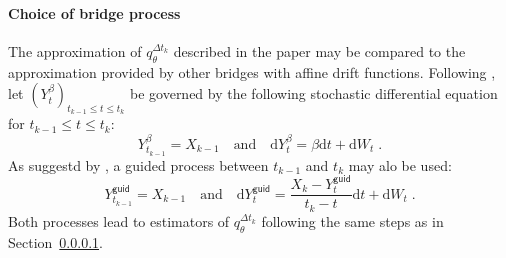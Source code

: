 \documentclass[12pt]{article}
\newcommand{\rmd}{\mathrm{d}}
\newcommand{\eqsp}{\;}
\newcommand{\1}{\mathrm{1}}
\newcommand{\mw}{\mathsf{w}}%
\begin{document}
\paragraph{Choice of bridge process}
The approximation of $q_{\theta}^{\Delta t_k}$ described in the paper may be compared to the approximation provided by other bridges with affine drift functions. Following \cite{}, let $(Y^{\beta}_t)_{t_{k-1}\le t\le t_k}$ be governed by the following stochastic differential equation for $t_{k-1}\le t\le t_k$:
\[
Y^{\beta}_{t_{k-1}} = X_{k-1}\quad\mbox{and}\quad\rmd Y^{\beta}_t = \beta\rmd t + \rmd W_t\eqsp.
\]
As suggestd by \cite{}, a guided process between $t_{k-1}$ and $t_k$ may alo be used:
\[
Y^{\mathsf{guid}}_{t_{k-1}} = X_{k-1}\quad\mbox{and}\quad\rmd Y^{\mathsf{guid}}_t = \frac{X_k - Y^{\mathsf{guid}}_t}{t_k-t}\rmd t + \rmd W_t\eqsp.
\]
Both processes lead to estimators of $q_{\theta}^{\Delta t_k}$ following the same steps as in Section~\ref{}.
\end{document}

